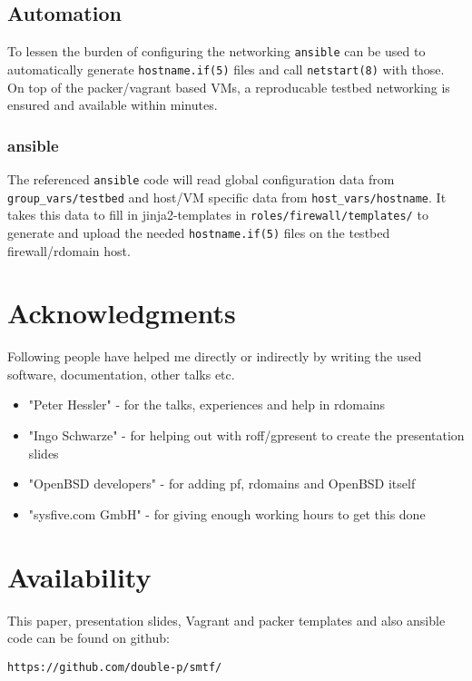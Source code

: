 \documentclass[letterpaper,twocolumn,10pt]{article}
\begin{document}
\subsection{Automation}
To lessen the burden of configuring the networking {\tt ansible} can be used to automatically generate {\tt hostname.if(5)} files and call {\tt netstart(8)} with those. On top of the packer/vagrant based VMs, a reproducable testbed networking is ensured and available within minutes.
\subsubsection{ansible}
The referenced {\tt ansible} code will read global configuration data from {\tt group\_vars/testbed} and host/VM specific data from {\tt host\_vars/hostname}. It takes this data to fill in jinja2-templates in {\tt roles/firewall/templates/} to generate and upload the needed {\tt hostname.if(5)} files on the testbed firewall/rdomain host.

\section{Acknowledgments}

Following people have helped me directly or indirectly by writing the used software, documentation, other talks etc.
\begin{itemize}
\item "Peter Hessler" \-- for the talks, experiences and help in rdomains
\item "Ingo Schwarze" \--  for helping out with roff/gpresent to create the presentation slides
\item "OpenBSD developers" \-- for adding pf, rdomains and OpenBSD itself
\item "sysfive.com GmbH" \-- for giving enough working hours to get this done
\end{itemize}

\section{Availability}
This paper, presentation slides, Vagrant and packer templates and also ansible code can be found on github:
\begin{center}
{\tt https://github.com/double-p/smtf/}
\end{center}
\end{document}
